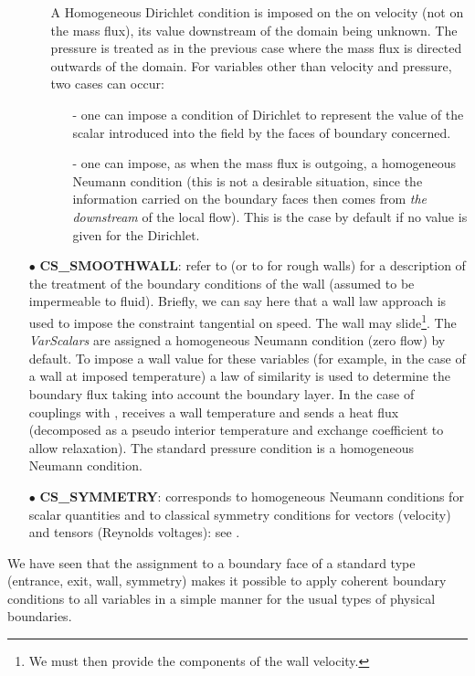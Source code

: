 \begin{itemize}
\begin{itemize}
A Homogeneous Dirichlet condition is imposed on the on velocity (not on the mass flux),
its value downstream of the domain being unknown. The pressure is
treated as in the previous case where the mass flux is
directed outwards of the domain. For variables other than
velocity and pressure, two cases can occur:
        \begin{itemize}
        \item[-] one can impose a condition of Dirichlet to represent the value of the scalar introduced into the field by the faces of boundary concerned.
        \item[-] one can impose, as when the mass flux is outgoing, a homogeneous Neumann condition (this is not a desirable situation, since the information carried on the boundary faces then comes from {\it the downstream} of the local flow). This is the case by default if no value is given for the Dirichlet.
        \end{itemize}
\end{itemize}
\item [$\bullet$] {\bf CS\_SMOOTHWALL}: refer to  (or to  for rough walls) for a description of the treatment of the boundary conditions of the wall (assumed to be impermeable to
fluid). Briefly, we can say here
that a wall law approach is used to impose the constraint
tangential on speed. The wall may slide\footnote{We must then provide
the components of the wall velocity.}. The {\it VarScalars} are assigned
a homogeneous Neumann condition (zero flow) by default.
To impose a wall value for these variables (for example, in the case of a
wall at imposed temperature) a law of similarity is used
to determine the boundary flux taking into account the boundary layer.
In the case of couplings with \syrthes, \CS
receives a wall temperature and sends a heat flux (decomposed as a pseudo interior temperature
and exchange coefficient to allow relaxation).
The standard pressure condition is a homogeneous Neumann condition.
\item [$\bullet$] {\bf CS\_SYMMETRY}: corresponds to homogeneous Neumann conditions for scalar quantities and to classical symmetry conditions for vectors (velocity) and tensors (Reynolds voltages): see .
\end{itemize}

We have seen that the assignment to a boundary face of a standard type
(entrance, exit, wall, symmetry) makes it possible to apply coherent
boundary conditions to all variables in a simple manner for the usual
types of physical boundaries.

